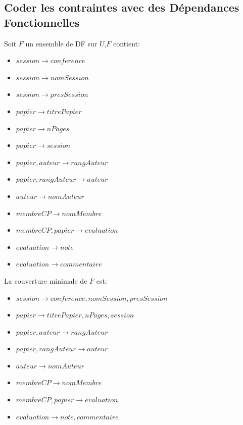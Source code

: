\documentclass[10pt,a4paper,twoside]{article}
\begin{document}
\subsection{Coder les contraintes avec des Dépendances Fonctionnelles}
Soit $F$ un ensemble de DF sur $U$,$F$ contient:
\begin{itemize}
\item $session \rightarrow conference$
\item $session \rightarrow nomSession$
\item $session \rightarrow presSession$
\item $papier \rightarrow titrePapier$
\item $papier \rightarrow nPages$
\item $papier \rightarrow session$
\item $papier,auteur \rightarrow rangAuteur$
\item $papier,rangAuteur \rightarrow auteur$
\item $auteur \rightarrow nomAuteur$
\item $membreCP \rightarrow nomMembre$
\item $membreCP,papier \rightarrow evaluation$
\item $evaluation \rightarrow note$
\item $evaluation \rightarrow commentaire$
\end{itemize}
La couverture minimale de $F$ est:
\begin{itemize}
\item $session \rightarrow conference,nomSession,presSession$
\item $papier \rightarrow titrePapier,nPages,session$
\item $papier,auteur \rightarrow rangAuteur$
\item $papier,rangAuteur \rightarrow auteur$
\item $auteur \rightarrow nomAuteur$
\item $membreCP \rightarrow nomMembre$
\item $membreCP,papier \rightarrow evaluation$
\item $evaluation \rightarrow note,commentaire$
\end{itemize}
\end{document}
